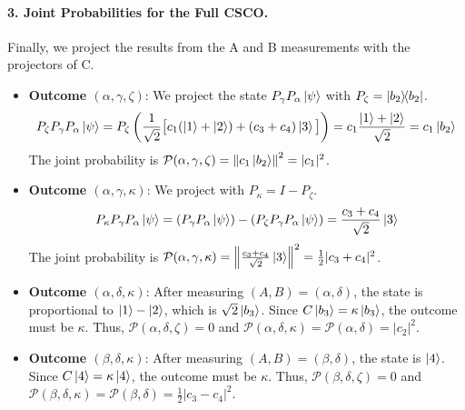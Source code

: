 \documentclass[11pt,a4paper]{article}
\begin{document}
  \paragraph{3. Joint Probabilities for the Full CSCO.}
  Finally, we project the results from the A and B measurements with the
  projectors of C.
  \begin{itemize}
    \item \textbf{Outcome $(\alpha, \gamma, \zeta)$}: We project the state
      $P_\gamma P_\alpha \ket{\psi}$ with $P_\zeta = \dyad{b_2}{b_2}$.
      $$ P_\zeta P_\gamma P_\alpha \ket{\psi} = P_\zeta \left( \frac{1}{\sqrt{2}}
      \big[ c_1(\ket{1}+\ket{2}) + (c_3+c_4)\ket{3} \big] \right) = c_1
      \frac{\ket{1}+\ket{2}}{\sqrt{2}} = c_1 \ket{b_2} $$
      The joint probability is $\mathcal{P}(\alpha, \gamma, \zeta) = \norm{c_1
      \ket{b_2}}^2 = |c_1|^2$.

    \item \textbf{Outcome $(\alpha, \gamma, \kappa)$}: We project with $P_\kappa =
      I - P_\zeta$.
      $$ P_\kappa P_\gamma P_\alpha \ket{\psi} = (P_\gamma P_\alpha \ket{\psi}) -
      (P_\zeta P_\gamma P_\alpha \ket{\psi}) = \frac{c_3+c_4}{\sqrt{2}}\ket{3} $$
      The joint probability is $\mathcal{P}(\alpha, \gamma, \kappa) =
      \norm{\frac{c_3+c_4}{\sqrt{2}}\ket{3}}^2 = \frac{1}{2}|c_3+c_4|^2$.

    \item \textbf{Outcome $(\alpha, \delta, \kappa)$}: After measuring
      $(A,B)=(\alpha,\delta)$, the state is proportional to $\ket{1}-\ket{2}$,
      which is $\sqrt{2}\ket{b_3}$. Since $C\ket{b_3}=\kappa\ket{b_3}$, the
      outcome must be $\kappa$. Thus, $\mathcal{P}(\alpha, \delta, \zeta)=0$ and
      $\mathcal{P}(\alpha, \delta, \kappa) = \mathcal{P}(\alpha, \delta) =
      |c_2|^2$.

    \item \textbf{Outcome $(\beta, \delta, \kappa)$}: After measuring
      $(A,B)=(\beta,\delta)$, the state is $\ket{4}$. Since
      $C\ket{4}=\kappa\ket{4}$, the outcome must be $\kappa$. Thus,
      $\mathcal{P}(\beta, \delta, \zeta)=0$ and $\mathcal{P}(\beta, \delta,
      \kappa) = \mathcal{P}(\beta, \delta) = \frac{1}{2}|c_3-c_4|^2$.
  \end{itemize}
\end{document}
